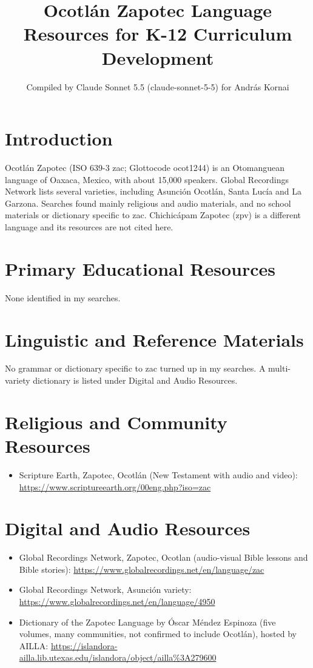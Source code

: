 \documentclass[12pt]{article}
\title{Ocotl\'an Zapotec Language Resources for K-12 Curriculum Development}
\author{Compiled by Claude Sonnet 5.5 (claude-sonnet-5-5) for Andr\'as Kornai}
\date{}
\begin{document}
\maketitle

\section{Introduction}
Ocotl\'an Zapotec (ISO 639-3 zac; Glottocode ocot1244) is an Otomanguean language of Oaxaca, Mexico, with about 15,000 speakers. Global Recordings Network lists several varieties, including Asunci\'on Ocotl\'an, Santa Luc\'ia and La Garzona. Searches found mainly religious and audio materials, and no school materials or dictionary specific to zac. Chichic\'apam Zapotec (zpv) is a different language and its resources are not cited here.

\section{Primary Educational Resources}
None identified in my searches.

\section{Linguistic and Reference Materials}
No grammar or dictionary specific to zac turned up in my searches. A multi-variety dictionary is listed under Digital and Audio Resources.

\section{Religious and Community Resources}
\begin{itemize}
\item Scripture Earth, Zapotec, Ocotl\'an (New Testament with audio and video): \url{https://www.scriptureearth.org/00eng.php?iso=zac}
\end{itemize}

\section{Digital and Audio Resources}
\begin{itemize}
\item Global Recordings Network, Zapotec, Ocotlan (audio-visual Bible lessons and Bible stories): \url{https://www.globalrecordings.net/en/language/zac}
\item Global Recordings Network, Asunci\'on variety: \url{https://www.globalrecordings.net/en/language/4950}
\item Dictionary of the Zapotec Language by \'Oscar M\'endez Espinoza (five volumes, many communities, not confirmed to include Ocotl\'an), hosted by AILLA: \url{https://islandora-ailla.lib.utexas.edu/islandora/object/ailla%3A279600}
\end{itemize}
\end{document}
